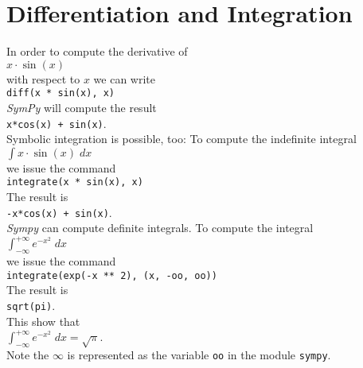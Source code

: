 \documentclass{report}
\begin{document}
\section{Differentiation and Integration}
In order to compute the derivative of
\\[0.2cm]
\hspace*{1.3cm}
$x \cdot \sin(x)$
\\[0.2cm]
with respect to $x$ we can write
\\[0.2cm]
\hspace*{1.3cm}
\texttt{diff(x * sin(x), x)}
\\[0.2cm]
\textsl{SymPy} will compute the result
\\[0.2cm]
\hspace*{1.3cm}
\texttt{x*cos(x) + sin(x)}.
\\[0.2cm]
Symbolic integration is possible, too:  To compute the indefinite integral
\\[0.2cm]
\hspace*{1.3cm}
$\displaystyle\int x \cdot \sin(x)\; dx$
\\[0.2cm]
we issue the command
\\[0.2cm]
\hspace*{1.3cm}
\texttt{integrate(x * sin(x), x)}
\\[0.2cm]
The result is
\\[0.2cm]
\hspace*{1.3cm}
\texttt{-x*cos(x) + sin(x)}.
\\[0.2cm]
\textsl{Sympy} can compute definite integrals.  To compute the integral
\\[0.2cm]
\hspace*{1.3cm}
$\displaystyle\int_{-\infty}^{+\infty} e^{-x^2} \; dx$
\\[0.2cm]
we issue the command
\\[0.2cm]
\hspace*{1.3cm}
\texttt{integrate(exp(-x ** 2), (x, -oo, oo))}
\\[0.2cm]
The result is
\\[0.2cm]
\hspace*{1.3cm}
\texttt{sqrt(pi)}.
\\[0.2cm]
This show that
\\[0.2cm]
\hspace*{1.3cm}
$\displaystyle\int_{-\infty}^{+\infty} e^{-x^2} \; dx = \sqrt{\pi}$.
\\[0.2cm]
Note the $\infty$ is represented as the variable \texttt{oo} in the module \texttt{sympy}.  
\end{document}
